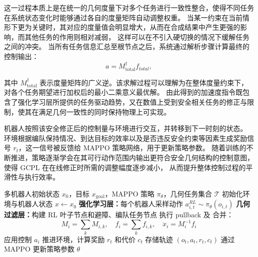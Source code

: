 这一过程本质上是在统一的几何度量下对多个任务进行一致性整合，使得不同任务在系统状态变化时能够通过各自的度量矩阵自动调整权重。
当某一约束在当前情形下更为关键时，其对应的度量值会明显增大，从而在合成结果中产生更强的影响，而其他任务的作用则相对减弱，
这样可以在不引入硬切换的情况下缓解任务之间的冲突。
当所有任务信息汇总至根节点之后，系统通过解析步骤计算最终的控制输出：
\begin{equation}
a = M_{\text{total}}^{\dagger} f_{total},
\end{equation}

其中 $M_{\text{total}}^{\dagger}$ 表示度量矩阵的广义逆。该求解过程可以理解为在整体度量约束下，对各个任务期望进行加权后的最小二乘意义最优解。
由此得到的加速度指令既包含了强化学习层所提供的任务驱动趋势，又在数值上受到安全相关任务的修正与限制，使其在满足几何一致性的同时保持物理上可实现。

机器人按照该安全修正后的控制量与环境进行交互，并转移到下一时刻的状态。
环境根据编队保持情况、到达目标的效率以及是否违反安全约束等因素生成奖励信号 $r_t$，这一信号被反馈给 MAPPO 策略网络，用于更新策略参数。
随着训练的不断推进，策略逐渐学会在其可行动作范围内输出更符合安全几何结构的控制意图，使得 GCPL 在在线修正时所需的调整幅度逐步减小，
从而提升整体控制过程的平滑性与执行效率。

\begin{algorithm}[t]
\caption{ GCPL 多机器人控制}
\label{alg:rl_rmpflow_simple}
\begin{algorithmic}[1]
\REQUIRE 多机器人初始状态 $x_0$，目标 $x_{\text{goal}}$，MAPPO 策略 $\pi_\theta$，几何任务集合 $\mathcal{T}$
    \STATE 初始化环境与机器人状态 $x \leftarrow x_0$
        \STATE \textbf{强化学习层：}每个机器人采样动作 $a^{RL}_{i,t} \sim \pi_\theta(o_{i,t})$
        \STATE \textbf{几何过滤层：}构建 RL 叶子节点和避障、编队任务节点
        \STATE 执行 pullback 及 合并：
        \[
        M_i = \sum_k M_{i,k}, \quad f_i = \sum_k f_{i,k}, \quad \ddot{x}_i = M_i^{-1} f_i
        \]
        \STATE 应用控制 $a_i$ 推进环境，计算奖励 $r_t$ 和代价 $c_t$
        \STATE 存储轨迹 $(o_t, a_t, r_t, c_t)$
    \ENDFOR
    \STATE 通过 MAPPO 更新策略参数 $\theta$
\ENDFOR
\end{algorithmic}
\end{algorithm}

